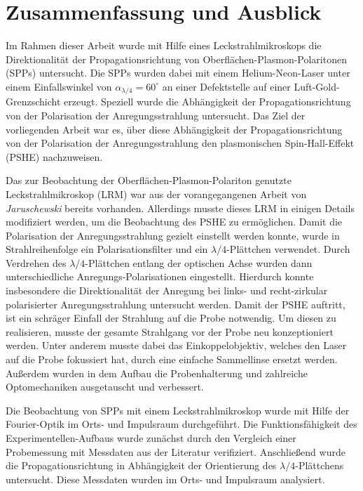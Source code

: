 \documentclass[a4paper, titlepage,  ngerman]{book}
\begin{document}
	\newpage
	\chapter{Zusammenfassung und Ausblick}
	Im Rahmen dieser Arbeit wurde mit Hilfe eines Leckstrahlmikroskops die Direktionalität der Propagationsrichtung von Oberflächen-Plasmon-Polaritonen (SPPs) untersucht. Die SPPs wurden dabei mit einem Helium-Neon-Laser unter einem Einfallswinkel von $\alpha_{\lambda/4}=60^\circ$ an einer Defektstelle auf einer Luft-Gold-Grenzschicht erzeugt. Speziell wurde die Abhängigkeit der Propagationsrichtung von der Polarisation der Anregungsstrahlung untersucht. Das Ziel der vorliegenden Arbeit war es, über diese Abhängigkeit der Propagationsrichtung von der Polarisation der Anregungsstrahlung den plasmonischen Spin-Hall-Effekt (PSHE) nachzuweisen.
	
	Das zur Beobachtung der Oberflächen-Plasmon-Polariton genutzte Leckstrahlmikroskop (LRM) war aus der vorangegangenen Arbeit \cite{Jaruschewski.2020} von  \textit{Jaruschewski} bereits vorhanden. Allerdings musste dieses LRM in einigen Details modifiziert werden, um die Beobachtung des PSHE zu ermöglichen. Damit die Polarisation der Anregungsstrahlung gezielt einstellt werden konnte, wurde in Strahlreihenfolge ein Polarisationsfilter und ein $\lambda/4$-Plättchen verwendet. Durch Verdrehen des $\lambda/4$-Plättchen entlang der optischen Achse wurden dann unterschiedliche Anregungs-Polarisationen eingestellt. Hierdurch konnte insbesondere die Direktionalität der Anregung bei links- und recht-zirkular polarisierter Anregungsstrahlung untersucht werden. Damit der PSHE auftritt, ist ein schräger Einfall der Strahlung auf die Probe notwendig. Um diesen zu realisieren, musste der gesamte Strahlgang vor der Probe neu konzeptioniert werden. Unter anderem musste dabei das Einkoppelobjektiv, welches den Laser auf die Probe fokussiert hat, durch eine einfache Sammellinse ersetzt werden. Außerdem wurden in dem Aufbau die Probenhalterung und zahlreiche Optomechaniken ausgetauscht und verbessert.
	
	Die Beobachtung von SPPs mit einem Leckstrahlmikroskop wurde mit Hilfe der Fourier-Optik im Orts- und Impulsraum durchgeführt. Die Funktionsfähigkeit des Experimentellen-Aufbaus wurde zunächst durch den Vergleich einer Probemessung mit Messdaten aus der Literatur verifiziert. Anschließend wurde die Propagationsrichtung in Abhängigkeit der Orientierung des $\lambda/4$-Plättchens untersucht. Diese Messdaten wurden im Orts- und Impulsraum analysiert.
	
\end{document}
